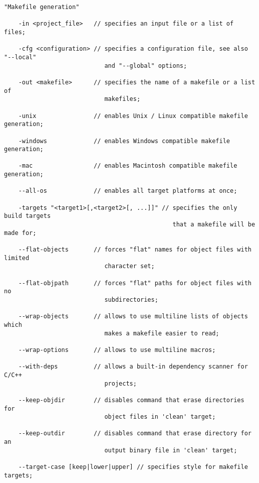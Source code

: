 
\begin{lstlisting}
"Makefile generation"

    -in <project_file>   // specifies an input file or a list of files;

    -cfg <configuration> // specifies a configuration file, see also "--local"
                            and "--global" options;

    -out <makefile>      // specifies the name of a makefile or a list of
                            makefiles;

    -unix                // enables Unix / Linux compatible makefile generation;

    -windows             // enables Windows compatible makefile generation;

    -mac                 // enables Macintosh compatible makefile generation;

    --all-os             // enables all target platforms at once;

    -targets "<target1>[,<target2>[, ...]]" // specifies the only build targets
                                               that a makefile will be made for;

    --flat-objects       // forces "flat" names for object files with limited
                            character set;

    --flat-objpath       // forces "flat" paths for object files with no
                            subdirectories;

    --wrap-objects       // allows to use multiline lists of objects which
                            makes a makefile easier to read;

    --wrap-options       // allows to use multiline macros;

    --with-deps          // allows a built-in dependency scanner for C/C++
                            projects;

    --keep-objdir        // disables command that erase directories for
                            object files in 'clean' target;

    --keep-outdir        // disables command that erase directory for an
                            output binary file in 'clean' target;

    --target-case [keep|lower|upper] // specifies style for makefile targets;
\end{lstlisting}